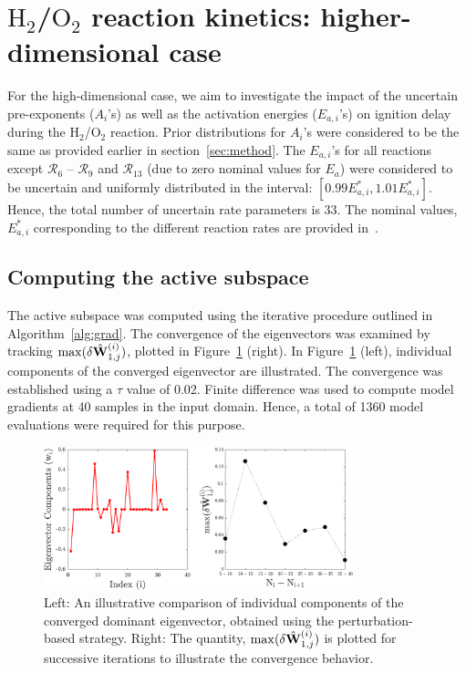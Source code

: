\section{$\text{H}_2$/$\text{O}_2$ reaction kinetics: higher-dimensional case}
\label{sec:app}

For the high-dimensional case, we aim to investigate the impact of the uncertain
pre-exponents ($A_i$'s) as well as the activation energies ($E_{a,i}$'s) on ignition 
delay during the H$_2$/O$_2$ reaction.  Prior distributions for $A_i$'s were considered
to be the same as provided earlier in section~\ref{sec:method}. The $E_{a,i}$'s for all
reactions except $\mathcal{R}_6$ -- $\mathcal{R}_9$ and $\mathcal{R}_{13}$ (due to 
zero nominal values for $E_a$)
were considered to be uncertain and uniformly distributed in the interval: 
$[0.99E_{a,i}^\ast, 1.01E_{a,i}^\ast]$. Hence, the total number of uncertain rate parameters
is 33. The nominal values, $E_{a,i}^\ast$
corresponding to the different reaction rates are provided in~\cite{Yetter:1991}. 

\subsection{Computing the active subspace}

The active subspace was computed using the iterative procedure outlined in Algorithm~\ref{alg:grad}.
The convergence of the eigenvectors
was examined by tracking $\max(\delta \hat{\mathbf{{W}}}_{1,j}^{(i)})$, plotted in 
Figure~\ref{fig:conv_app} (right). In Figure~\ref{fig:conv_app} (left), individual
components of the converged eigenvector are illustrated. The convergence was established using
a $\tau$ value of 0.02. Finite difference was used to compute model gradients at 40 samples in
the input domain. Hence, a total of 1360 model evaluations were required for this purpose.  
%
\begin{figure}[htbp]
 \begin{center}
  \includegraphics[width=0.8\textwidth]{./Figures/eigv10}
\caption{Left: An illustrative comparison of individual components of the converged dominant eigenvector,
obtained using the perturbation-based strategy. Right: The quantity,  
$\max(\delta \hat{\mathbf{{W}}}_{1,j}^{(i)})$
is plotted for successive iterations to illustrate the convergence behavior.}
\label{fig:conv_app}
\end{center}
\end{figure}
%
 
